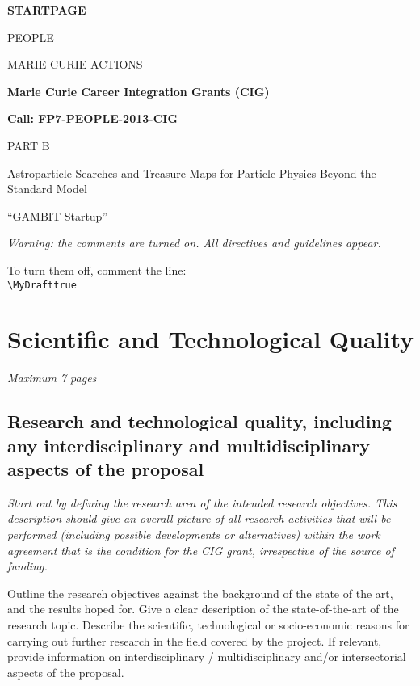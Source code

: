 \documentclass[a4paper,11pt]{article}
\title{\mytitle}
\newif\ifMyDraft%
\newcommand{\projectname}[0]{GAMBIT Startup\xspace}
\newcommand{\mytitle}{Astroparticle Searches and Treasure Maps for Particle Physics Beyond the Standard Model}
\newenvironment{xcomment}{\em}{}
\newcommand{\cover}[1]{%

\newpage
\begin{center}
\LARGE
\vspace{6cm}

\textbf{#1}
\vspace{2cm}

PEOPLE

MARIE CURIE ACTIONS
\vspace{2cm}

\textbf{Marie Curie Career Integration Grants (CIG)}

\textbf{Call: FP7-PEOPLE-2013-CIG}

\vspace{4cm}

PART B
\vspace{2cm}

\mytitle
\vspace{1cm}

``\projectname''

\cfoot{}

\end{center}

\newpage
}
\begin{document}
\cover{STARTPAGE}
\tableofcontents

\newpage


\begin{xcomment} 
Warning: the comments are turned on. All directives and guidelines appear.

To turn them off, comment the line:\\ 
\verb|\MyDrafttrue|\\

\end{xcomment} 


\section{Scientific and Technological Quality}

\begin{xcomment}  
Maximum 7 pages
\end{xcomment}

\subsection{Research and technological quality, including any interdisciplinary and multidisciplinary aspects of the proposal}
\label{outline}

\begin{xcomment}  
Start out by defining the research area of the intended research
objectives. This description should give an overall picture of all
research activities that will be performed (including possible
developments or alternatives) within the work agreement that is the
condition for the CIG grant, irrespective of the source of funding.

Outline the research objectives against the background of the state of
the art, and the results hoped for. Give a clear description of the
state-of-the-art of the research topic. Describe the scientific,
technological or socio-economic reasons for carrying out further
research in the field covered by the project. If relevant, provide
information on interdisciplinary / multidisciplinary and/or
intersectorial aspects of the proposal.
\end{xcomment}
\end{document}
